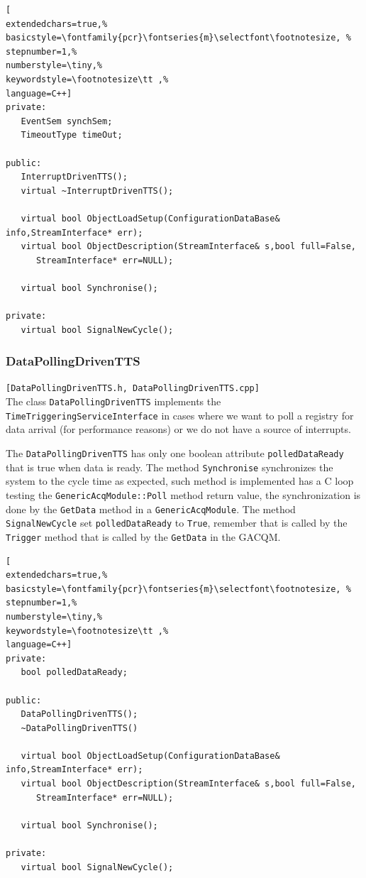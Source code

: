 \begin{lstlisting}[
extendedchars=true,%
basicstyle=\fontfamily{pcr}\fontseries{m}\selectfont\footnotesize, %
stepnumber=1,%
numberstyle=\tiny,%
keywordstyle=\footnotesize\tt ,%
language=C++]
private:
   EventSem synchSem;
   TimeoutType timeOut;

public:
   InterruptDrivenTTS();
   virtual ~InterruptDrivenTTS();

   virtual bool ObjectLoadSetup(ConfigurationDataBase& info,StreamInterface* err);
   virtual bool ObjectDescription(StreamInterface& s,bool full=False,
      StreamInterface* err=NULL);

   virtual bool Synchronise();

private:
   virtual bool SignalNewCycle();
\end{lstlisting}



\subsubsection{DataPollingDrivenTTS}
\texttt{[DataPollingDrivenTTS.h, DataPollingDrivenTTS.cpp]} \\
The class \texttt{DataPollingDrivenTTS} implements the \texttt{TimeTriggeringServiceInterface} in cases where we want to poll a registry for data arrival (for performance reasons) or we do not have a source of interrupts. 

The \texttt{DataPollingDrivenTTS} has only one boolean attribute \texttt{polledDataReady} that is true when data is ready. The method \texttt{Synchronise} synchronizes the system to the cycle time as expected, such method is implemented has a C loop testing the \texttt{GenericAcqModule::Poll} method return value, the synchronization is done by the \texttt{GetData} method in a \texttt{GenericAcqModule}. The method \texttt{SignalNewCycle} set \texttt{polledDataReady} to \texttt{True}, remember that is called by the \texttt{Trigger} method that is called by the \texttt{GetData} in the GACQM.

\begin{lstlisting}[
extendedchars=true,%
basicstyle=\fontfamily{pcr}\fontseries{m}\selectfont\footnotesize, %
stepnumber=1,%
numberstyle=\tiny,%
keywordstyle=\footnotesize\tt ,%
language=C++]
private:
   bool polledDataReady;

public:
   DataPollingDrivenTTS();
   ~DataPollingDrivenTTS()

   virtual bool ObjectLoadSetup(ConfigurationDataBase& info,StreamInterface* err);
   virtual bool ObjectDescription(StreamInterface& s,bool full=False,
      StreamInterface* err=NULL);

   virtual bool Synchronise();

private:
   virtual bool SignalNewCycle();
\end{lstlisting}



